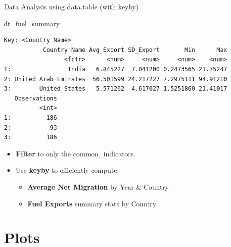 \documentclass[
  8pt,
  ignorenonframetext,
]{beamer}
\newenvironment{Shaded}{\begin{snugshade}}{\end{snugshade}}
\newcommand{\NormalTok}[1]{\textcolor[rgb]{0.00,0.23,0.31}{#1}}
\providecommand{\tightlist}{%
  \setlength{\itemsep}{0pt}\setlength{\parskip}{0pt}}\usepackage{longtable,booktabs,array}
\begin{document}
\begin{frame}[fragile]{Data Analysis using data.table (with keyby)}
\label{data-analysis-using-data.table-with-keyby-1}
\begin{Shaded}
\begin{Highlighting}[]
\NormalTok{dt\_fuel\_summary}
\end{Highlighting}
\end{Shaded}

\begin{verbatim}
Key: <Country Name>
           Country Name Avg_Export SD_Export       Min      Max
                 <fctr>      <num>     <num>     <num>    <num>
1:                India   6.845227  7.041200 0.2473565 21.75247
2: United Arab Emirates  56.501599 24.217227 7.2975111 94.91210
3:        United States   5.571262  4.617027 1.5251860 21.41017
   Observations
          <int>
1:          186
2:           93
3:          186
\end{verbatim}

\begin{itemize}
\item
  \textbf{Filter} to only the common\_indicators.
\item
  Use \textbf{keyby} to efficiently compute:

  \begin{itemize}
  \tightlist
  \item
    \textbf{Average Net Migration} by Year \& Country
  \item
    \textbf{Fuel Exports} summary stats by Country
  \end{itemize}
\end{itemize}
\end{frame}

\section{Plots}\label{plots}
\end{document}
